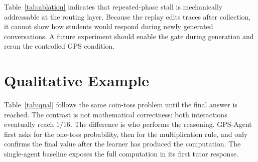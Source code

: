 \documentclass[11pt]{article}
\begin{document}
Table~\ref{tab:ablation} indicates that repeated-phase stall is mechanically addressable at the routing layer. Because the replay edits traces after collection, it cannot show how students would respond during newly generated conversations. A future experiment should enable the gate during generation and rerun the controlled GPS condition.
\FloatBarrier

\section{Qualitative Example}
Table~\ref{tab:qual} follows the same coin-toss problem until the final answer is reached. The contrast is not mathematical correctness: both interactions eventually reach $1/16$. The difference is who performs the reasoning. GPS-Agent first asks for the one-toss probability, then for the multiplication rule, and only confirms the final value after the learner has produced the computation. The single-agent baseline exposes the full computation in its first tutor response.
\end{document}
